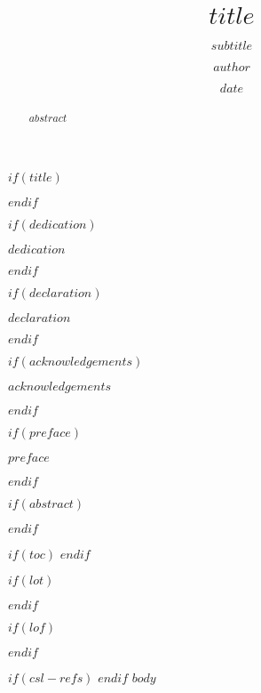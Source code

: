 \documentclass[12pt,twoside]{unicam}
\title{$title$}
\author{$author$}
\subtitle{$subtitle$}
\date{$date$}
\begin{document}
$if(title)$
  \maketitle
$endif$

\frontmatter %
\pagestyle{empty} %

$if(dedication)$
  \begin{dedication}
    $dedication$
  \end{dedication}
$endif$

$if(declaration)$
  \begin{declaration}
    $declaration$
  \end{declaration}
$endif$

$if(acknowledgements)$
  \begin{acknowledgements}
    $acknowledgements$
  \end{acknowledgements}
$endif$

$if(preface)$
  \begin{preface}
    $preface$
  \end{preface}
$endif$

$if(abstract)$
  \begin{abstract}
    $abstract$
  \end{abstract}
$endif$

$if(toc)$
  \hypersetup{linkcolor=$if(toccolor)$$toccolor$$else$black$endif$}
  \setcounter{tocdepth}{$toc-depth$}
  \tableofcontents
$endif$

$if(lot)$
  \listoftables
$endif$

$if(lof)$
  \listoffigures
$endif$

\printnomenclature

$if(csl-refs)$
\newlength{\cslhangindent}
\setlength{\cslhangindent}{1.5em}
\newenvironment{cslreferences}%
  {$if(csl-hanging-indent)$\setlength{\parindent}{0pt}%
  \everypar{\setlength{\hangindent}{\cslhangindent}}\ignorespaces$endif$}%
  {\par}
$endif$
\setlength{\parskip}{0.2cm}
\mainmatter %
\pagestyle{fancyplain} %
\hypersetup{
    colorlinks=true,
    linkcolor=black,
    filecolor=black,      
    urlcolor=black,
}
$body$
\end{document}
